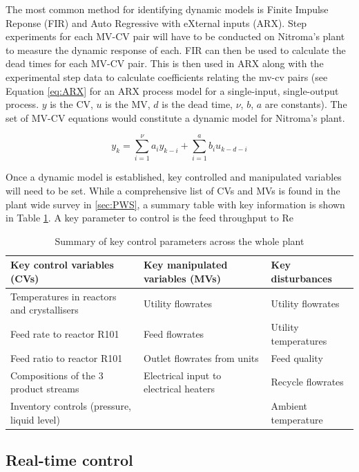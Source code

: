 The most common method for identifying dynamic models is Finite Impulse Reponse (FIR) and Auto Regressive with eXternal inputs (ARX). Step experiments for each MV-CV pair will have to be conducted on Nitroma's plant to measure the dynamic response of each. FIR can then be used to calculate the dead times for each MV-CV pair. This is then used in ARX along with the experimental step data to calculate coefficients relating the mv-cv pairs (see Equation \ref{eq:ARX} for an ARX process model for a single-input, single-output process. $y$ is the CV, $u$ is the MV, $d$ is the dead time, $\nu$, $b$, $a$ are constants). The set of MV-CV equations would constitute a dynamic model for Nitroma's plant. 

\begin{equation} \label{eq:ARX}
    y_k = \sum_{i=1}^{\nu}a_{i}y_{k-i} + \sum_{i=1}^{a}b_{i}u_{k-d-i}
\end{equation}

Once a dynamic model is established, key controlled and manipulated variables will need to be set. While a comprehensive list of CVs and MVs is found in the plant wide survey in \ref{sec:PWS}, a summary table with key information is shown in Table \ref{tab:key-parameters}. A key parameter to control is the feed throughput to Re

\begin{table}[h]
\centering
    \caption{Summary of key control parameters across the whole plant}
    \label{tab:key-parameters}
\begin{tabular}{@{}lll@{}}
\toprule
\textbf{Key control variables (CVs)}        & \textbf{Key manipulated variables (MVs)} & \textbf{Key disturbances} \\ \midrule
Temperatures in reactors and crystallisers  & Utility flowrates                        & Utility flowrates         \\
Feed rate to reactor R101                   & Feed flowrates                           & Utility temperatures      \\
Feed ratio to reactor R101                  & Outlet flowrates from units              & Feed quality              \\
Compositions of the 3 product streams       & Electrical input to electrical heaters   & Recycle flowrates         \\
Inventory controls (pressure, liquid level) &                                          & Ambient temperature       \\ \bottomrule
\end{tabular}
\end{table}



\subsection{Real-time control}